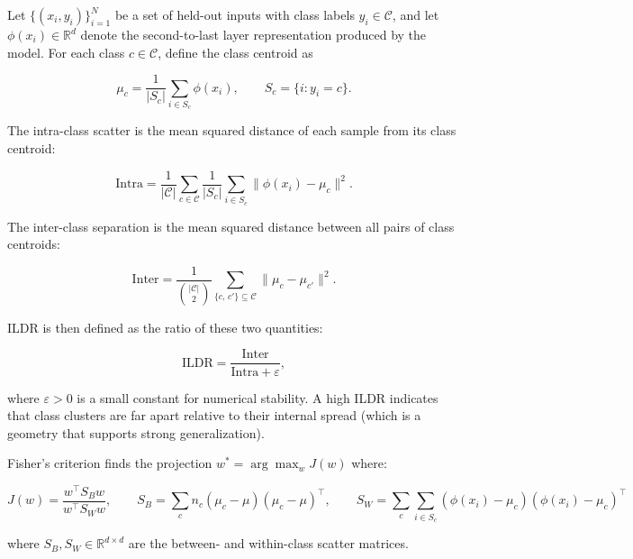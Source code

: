 \documentclass{article}
\begin{document}
Let $\{(x_i, y_i)\}_{i=1}^{N}$ be a set of held-out inputs with class labels 
$y_i \in \mathcal{C}$, and let $\phi(x_i) \in \mathbb{R}^d$ denote the 
second-to-last layer representation produced by the model. For each class 
$c \in \mathcal{C}$, define the class centroid as

\begin{equation}
    \mu_c = \frac{1}{|S_c|} \sum_{i \in S_c} \phi(x_i),
    \qquad S_c = \{i : y_i = c\}.
\end{equation}

The intra-class scatter is the mean squared distance of each sample 
from its class centroid:

\begin{equation}
    \text{Intra} = \frac{1}{|\mathcal{C}|} \sum_{c \in \mathcal{C}}
    \frac{1}{|S_c|} \sum_{i \in S_c} \|\phi(x_i) - \mu_c\|^2.
\end{equation}

The inter-class separation is the mean squared distance between all 
pairs of class centroids:

\begin{equation}
    \text{Inter} = \frac{1}{\binom{|\mathcal{C}|}{2}}
    \sum_{\{c,\, c'\} \subseteq \mathcal{C}} \|\mu_c - \mu_{c'}\|^2.
\end{equation}

ILDR is then defined as the ratio of these two quantities:

\begin{equation}
    \text{ILDR} = \frac{\text{Inter}}{\text{Intra} + \varepsilon},
    \label{eq:ildr}
\end{equation}

where $\varepsilon > 0$ is a small constant for numerical stability. A high 
ILDR indicates that class clusters are far apart relative to their internal 
spread (which is a geometry that supports strong generalization). 

\vspace{5pt}
Fisher's criterion finds the projection $w^* = \arg\max_w J(w)$ where:

\begin{equation}
    J(w) = \frac{w^\top S_B w}{w^\top S_W w}, 
    \qquad
    S_B = \sum_c n_c(\mu_c - \mu)(\mu_c - \mu)^\top,
    \qquad
    S_W = \sum_c \sum_{i \in S_c}
    (\phi(x_i) - \mu_c)(\phi(x_i) - \mu_c)^\top
\end{equation}

where $S_B, S_W \in \mathbb{R}^{d \times d}$ are the between- and within-class 
scatter matrices. 
\end{document}
